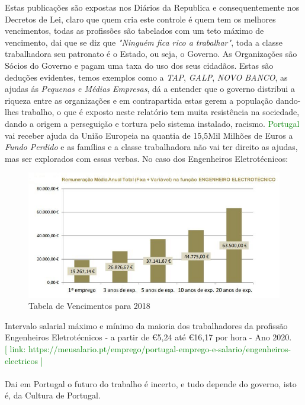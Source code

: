 Estas publicações são expostas nos Diários da Republica e consequentemente nos Decretos de Lei, claro que quem cria este controle é quem tem os melhores vencimentos, todas as profissões são tabelados com um teto máximo de vencimento, dai que se diz que \textit{"Ninguém fica rico a trabalhar"}, toda a classe trabalhadora seu patronato é o Estado, ou seja, o Governo. As Organizações são Sócios do Governo e pagam uma taxa do uso dos seus cidadãos. Estas são deduções evidentes, temos exemplos como a \textit{TAP}, \textit{GALP}, \textit{NOVO BANCO}, as ajudas ás \textit{Pequenas e Médias Empresas}, dá a entender que o governo distribui a riqueza entre as organizações e em contrapartida estas gerem a população dando-lhes trabalho, o que é exposto neste relatório tem muita resistência na sociedade, dando a origem a perseguição e tortura pelo sistema instalado, racismo. \textcolor{green}{Portugal} vai receber ajuda da União Europeia na quantia de 15,5Mil Milhões de Euros a \textit{Fundo Perdido} e as famílias e a classe trabalhadora não vai ter direito as ajudas, mas ser explorados com essas verbas.
\newpage
No caso dos Engenheiros Eletrotécnicos:\\
\begin{figure}[H]
	\centering
	\includegraphics[scale=0.52]{./image/Salary/Eng_Elec.jpg}
	\caption{Tabela de Vencimentos para 2018 \cite{article_3}}
\end{figure}
Intervalo salarial máximo e mínimo da maioria dos trabalhadores da profissão Engenheiros Eletrotécnicos - a partir de \euro 5,24 até \euro 16,17 por hora - Ano 2020. \\
\textcolor{green}{[ link: \quad  https://meusalario.pt/emprego/portugal-emprego-e-salario/engenheiros-electricos ]} \\
\\
Dai em Portugal o futuro do trabalho é incerto, e tudo depende do governo, isto é, da Cultura de Portugal.
\newpage
